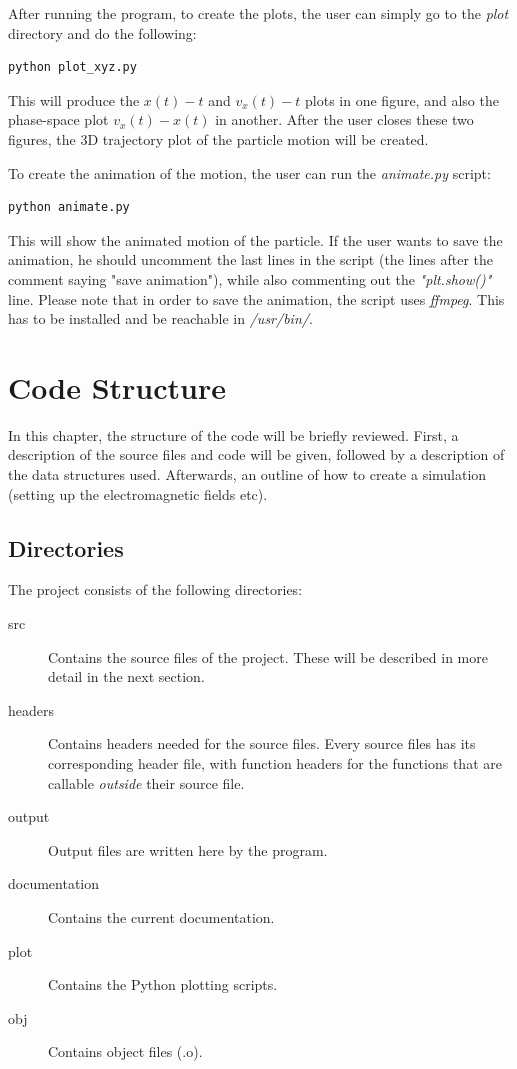 \documentclass[11pt]{report}
\begin{document}
After running the program, to create the plots, the user can simply go to the \emph{plot} directory and do the following:

\begin{lstlisting}
python plot_xyz.py
\end{lstlisting}

This will produce the $x(t)-t$ and $v_x(t)-t$ plots in one figure, and also the phase-space plot $v_x(t) - x(t)$ in another. After the user closes these two figures, the 3D trajectory plot of the particle motion will be created.

To create the animation of the motion, the user can run the \emph{animate.py} script:

\begin{lstlisting}
python animate.py
\end{lstlisting}

This will show the animated motion of the particle. If the user wants to save the animation, he should uncomment the last lines in the script (the lines after the comment saying "save animation"), while also commenting out the \emph{"plt.show()"} line. Please note that in order to save the animation, the script uses \emph{ffmpeg}. This has to be installed and be reachable in \emph{/usr/bin/}.
 
\chapter{Code Structure}
In this chapter, the structure of the code will be briefly reviewed. First, a description of the source files and code will be given, followed by a description of the data structures used. Afterwards, an outline of how to create a simulation (setting up the electromagnetic fields etc).

\section{Directories}
The project consists of the following directories:

\begin{description}
\item[src] Contains the source files of the project. These will be described in more detail in the next section.
\item[headers] Contains headers needed for the source files. Every source files has its corresponding header file, with function headers for the functions that are callable \emph{outside} their source file.
\item[output] Output files are written here by the program.
\item[documentation] Contains the current documentation.
\item[plot] Contains the Python plotting scripts.
\item[obj] Contains object files (.o).
\end{description}
\end{document}
